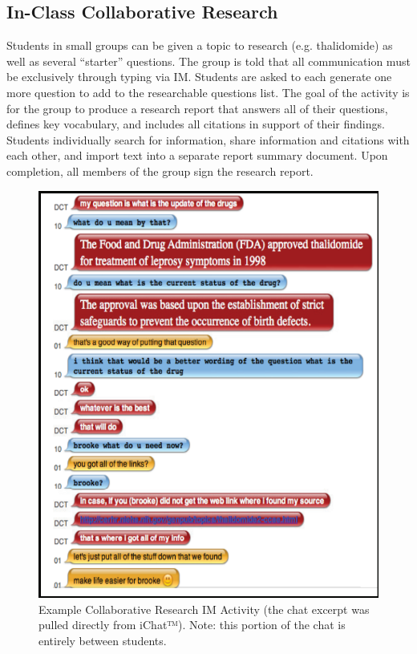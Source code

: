 \documentclass[11.5pt]{sig-alternate} %
\begin{document}
\begin{large}
\subsection*{In-Class Collaborative Research}

Students in small groups can be given a topic to research (e.g. thalidomide) as well as several ``starter'' questions. The group is told that all communication must be exclusively through typing via IM. Students are asked to each generate one more question to add to the researchable questions list. The goal of the activity is for the group to produce a research report that answers all of their questions, defines key vocabulary, and includes all citations in support of their findings. Students individually search for information, share information and citations with each other, and import text into a separate report summary document. Upon completion, all members of the group sign the research report. 

\begin{figure}[ht]
    \centering
    \includegraphics[width=0.9\linewidth]{images/fig3.png}
    \caption{Example Collaborative Research IM Activity (the chat excerpt was pulled directly from iChat™). Note: this portion of the chat is entirely between students. }
\end{figure}


\end{large}
\end{document}
